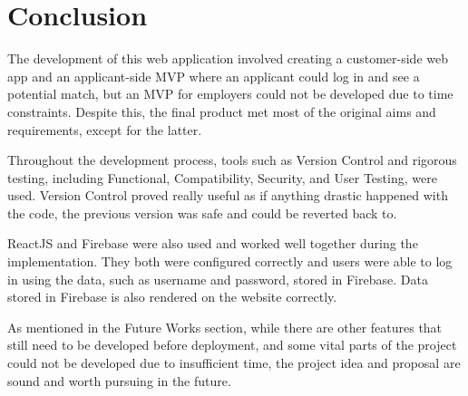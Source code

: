 \chapter{Conclusion}
The development of this web application involved creating a customer-side web app and an applicant-side MVP where an applicant could log in and see a potential match, but an MVP for employers could not be developed due to time constraints. Despite this, the final product met most of the original aims and requirements, except for the latter.

Throughout the development process, tools such as Version Control and rigorous testing, including Functional, Compatibility, Security, and User Testing, were used. Version Control proved really useful as if anything drastic happened with the code, the previous version was safe and could be reverted back to. 

ReactJS and Firebase were also used and worked well together during the implementation. They both were configured correctly and users were able to log in using the data, such as username and password, stored in Firebase. Data stored in Firebase is also rendered on the website correctly.

As mentioned in the Future Works section, while there are other features that still need to be developed before deployment, and some vital parts of the project could not be developed due to insufficient time, the project idea and proposal are sound and worth pursuing in the future.